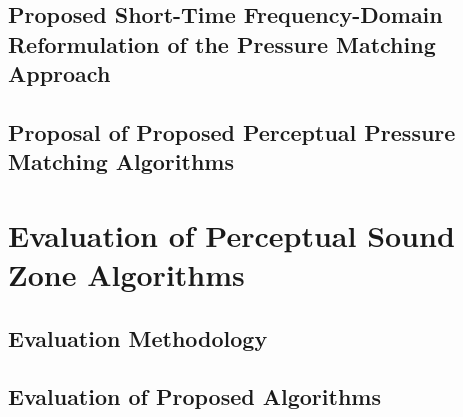 \documentclass[10pt,twoside,openright,titlepage]{ce}
\begin{document}
\section{Proposed Short-Time Frequency-Domain Reformulation of the Pressure Matching Approach}
\label{ch:perceptual_sound_zone:block_based}

\newpage
% 
\section{Proposal of Proposed Perceptual Pressure Matching Algorithms}
\label{ch:perceptual_sound_zone:perceptual_minimization}

\newpage
% 

\chapter{Evaluation of Perceptual Sound Zone Algorithms}
\label{ch:results}

\newpage
\section{Evaluation Methodology}

\section{Evaluation of Proposed Algorithms}

\newpage
% 
\end{document}
